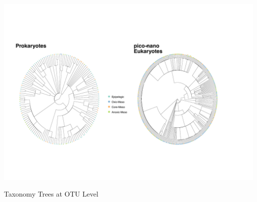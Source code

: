 \documentclass[fleqn,10pt]{wlscirep}
\begin{document}
\begin{suppfigure}[ht]
    \centering
    \includegraphics[scale=0.6,origin=c]{images/Trees_OTU_sup.pdf}
    \caption{Taxonomy Trees at OTU Level}
    \label{fig:tax_trees_sup}
\end{suppfigure}
\clearpage
\end{document}
